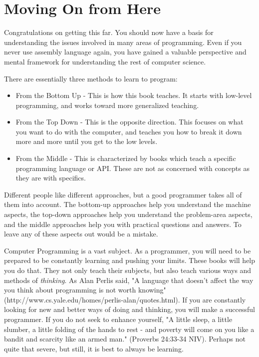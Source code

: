 \chapter{Moving On from Here}
\label{wherenextch}

% 
% 
% 
% 

Congratulations on getting this far.  You should now have a basis for 
understanding the issues involved in many areas of programming.  Even
if you never use assembly language again, you have gained a valuable
perspective and mental framework for understanding the rest of computer
science. 

There are essentially three methods to learn to program:

\begin{itemize}\item From the Bottom Up - This is how this book teaches.  It starts with low-level programming, and works toward more generalized teaching. 
\item From the Top Down - This is the opposite direction.  This focuses on what you want to do with the computer, and teaches you how to break it down more and more until you get to the low levels. 
\item From the Middle - This is characterized by books which teach a specific programming language or API.  These are not as concerned with concepts as they are with specifics. 
\end{itemize}

Different people like different approaches, but a good programmer takes all of 
them into account.  The bottom-up approaches help you understand the machine 
aspects, the top-down approaches help you understand the problem-area aspects,
and the middle approaches help you with practical questions and answers.  To
leave any of these aspects out would be a mistake.

Computer Programming is a vast subject.  As a programmer, you will need
to be prepared to be constantly learning and pushing your limits.  These
books will help you do that.  They not only teach their subjects, but also
teach various ways and methods of \emph{thinking}.  As
Alan Perlis said, "A language that doesn't affect the way you think about
programming is not worth knowing" 
(http://www.cs.yale.edu/homes/perlis-alan/quotes.html).  If you are 
constantly looking for new and better ways of doing and thinking, you
will make a successful programmer.  If you do not seek to enhance yourself,
"A little sleep, a little slumber, a little folding of the hands to rest - 
and poverty will come on you like a bandit and scarcity like an armed man."
(Proverbs 24:33-34 NIV).  Perhaps not quite that severe, but still, it is best
to always be learning.

